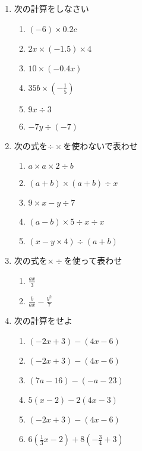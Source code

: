 \documentclass[twocolumn, fleqn]{jsarticle}
\begin{document}
\begin{enumerate}
  \item 次の計算をしなさい 

      \begin{enumerate}
        \item  $(-6) \times 0.2c$
          \vfill
        \item  $2x \times(-1.5) \times 4$
          \vfill
        \item  $10 \times (-0.4x)$
          \vfill
        \item $ 35b \times(-\frac{1}{5})$
          \vfill
        \item $9x \div 3$
          \vfill
          \newpage

        \item $ -7y \div (-7)$
          \vfill
      \end{enumerate}
    \item 次の式を$\div \times $を使わないで表わせ
      \begin{enumerate}
        \item $ a \times a \times 2 \div b$
          \vfill
        \item $(a+b) \times ( a+b) \div x$
          \vfill
          \item $ 9 \times x - y \div 7 $
            \vfill
          \item $ (a-b) \times 5 \div x \div x$
            \vfill
          \item $ (x-y \times 4) \div (a + b)$
            \vfill
      \end{enumerate}
      \item 次の式を$ \times \div $を使って表わせ
        \begin{enumerate}

          \item $ \frac{ax}{3}$
            \vfill
          \item $ \frac{b}{ax} - \frac{y^2}{7}$
            \vfill
        \end{enumerate}
        \newpage
            \item 次の計算をせよ
        \begin{enumerate}
          \item $ (-2x +3) -(4x -6)$
            \vfill
          \item $ (-2x +3) -(4x -6)$
            \vfill
          \item $ (7a -16) -(-a-23)$
            \vfill
          \item $5(x-2) -2(4x-3)$
            \vfill
          \item $ (-2x +3) -(4x -6)$
            \vfill
          \item $ 6(\frac{1}{3}x -2) +8(-\frac{3}{4}+3)$
            \vfill
        \end{enumerate}


  \end{enumerate}
\end{document}
